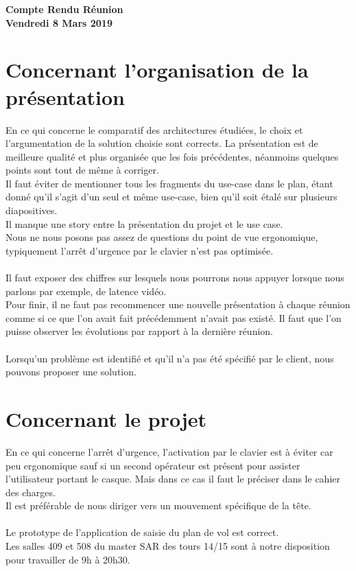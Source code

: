 \documentclass[]{article}
\begin{document}
\pagestyle{fancy}
\renewcommand\headrulewidth{1pt}
\renewcommand\footrulewidth{1pt}

\begin{center}
\large{\textbf{Compte Rendu Réunion \\ Vendredi 8 Mars 2019 \bigbreak}}
\end{center}

\section{Concernant l'organisation de la présentation}
En ce qui concerne le comparatif des architectures étudiées, le choix et l'argumentation de la solution choisie sont corrects. La présentation est de meilleure qualité et plus organisée que les fois précédentes, néanmoins quelques points sont tout de même à corriger.\\
\indent Il faut éviter de mentionner tous les fragments du use-case dans le plan, étant donné qu'il s'agit d'un seul et même use-case, bien qu'il soit étalé sur plusieurs diapositives.\\
Il manque une story entre la présentation du projet et le use case.\\
\indent Nous ne nous posons pas assez de questions du point de vue ergonomique, typiquement l'arrêt d'urgence par le clavier n'est pas optimisée.\\
\\
\indent Il faut exposer des chiffres sur lesquels nous pourrons nous appuyer lorsque nous parlons par exemple, de latence vidéo.\\
\indent Pour finir, il ne faut pas recommencer une nouvelle présentation à chaque réunion comme si ce que l'on avait fait précédemment n'avait pas existé. Il faut que l'on puisse observer les évolutions par rapport à la dernière réunion. \\
\\
\indent Lorsqu’un problème est identifié et qu'il n'a pas été spécifié par le client, nous pouvons proposer une solution.\\


\section{Concernant le projet}
En ce qui concerne l'arrêt d'urgence, l'activation par le clavier est à éviter car peu ergonomique sauf si un second opérateur est présent pour assister l'utilisateur portant le casque. Mais dans ce cas il faut le préciser dans le cahier des charges.\\
Il est préférable de nous diriger vers un mouvement spécifique de la tête.\\
\\
\indent Le prototype de l'application de saisie du plan de vol est correct.\\
\indent Les salles 409 et 508 du master SAR des tours 14/15 sont à notre disposition pour travailler de 9h à 20h30.\\
\end{document}
